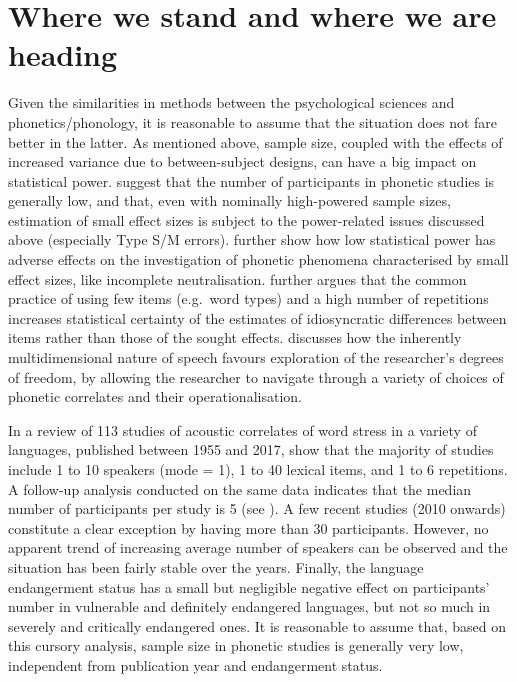 \documentclass[12pt,a4paper,]{article}
\begin{document}
\hypertarget{where-we-stand-and-where-we-are-heading}{%
\section{Where we stand and where we are
heading}\label{where-we-stand-and-where-we-are-heading}}

Given the similarities in methods between the psychological sciences and
phonetics/phonology, it is reasonable to assume that the situation does
not fare better in the latter. As mentioned above, sample size, coupled
with the effects of increased variance due to between-subject designs,
can have a big impact on statistical power. \citet{kirby2018} suggest
that the number of participants in phonetic studies is generally low,
and that, even with nominally high-powered sample sizes, estimation of
small effect sizes is subject to the power-related issues discussed
above (especially Type S/M errors). \citet{nicenboim2018a} further show
how low statistical power has adverse effects on the investigation of
phonetic phenomena characterised by small effect sizes, like incomplete
neutralisation. \citet{winter2015} further argues that the common
practice of using few items (e.g.~word types) and a high number of
repetitions increases statistical certainty of the estimates of
idiosyncratic differences between items rather than those of the sought
effects. \citet{roettger2019} discusses how the inherently
multidimensional nature of speech favours exploration of the
researcher's degrees of freedom, by allowing the researcher to navigate
through a variety of choices of phonetic correlates and their
operationalisation.

In a review of 113 studies of acoustic correlates of word stress in a
variety of languages, published between 1955 and 2017,
\citet{roettger2017} show that the majority of studies include 1 to 10
speakers (mode = 1), 1 to 40 lexical items, and 1 to 6 repetitions. A
follow-up analysis conducted on the same data indicates that the median
number of participants per study is 5 (see ). A few
recent studies (2010 onwards) constitute a clear exception by having
more than 30 participants. However, no apparent trend of increasing
average number of speakers can be observed and the situation has been
fairly stable over the years. Finally, the language endangerment status
has a small but negligible negative effect on participants' number in
vulnerable and definitely endangered languages, but not so much in
severely and critically endangered ones. It is reasonable to assume
that, based on this cursory analysis, sample size in phonetic studies is
generally very low, independent from publication year and endangerment
status.
\end{document}
